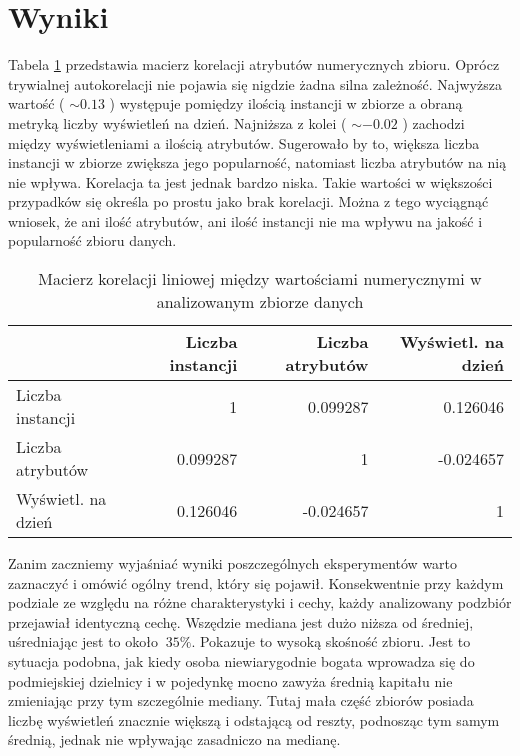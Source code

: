 \section{Wyniki}

Tabela \ref{tab:correlation} przedstawia macierz korelacji atrybutów numerycznych zbioru.
Oprócz trywialnej autokorelacji nie pojawia się nigdzie żadna silna zależność.
Najwyższa wartość ( \( \sim 0.13 \) ) występuje pomiędzy ilością instancji w zbiorze a obraną metryką liczby wyświetleń na dzień.
Najniższa z kolei ( \( \sim -0.02 \) ) zachodzi między wyświetleniami a ilością atrybutów.
Sugerowało by to, większa liczba instancji w zbiorze zwiększa jego popularność, natomiast liczba atrybutów na nią nie wpływa.
Korelacja ta jest jednak bardzo niska.
Takie wartości w większości przypadków się określa po prostu jako brak korelacji.
Można z tego wyciągnąć wniosek, że ani ilość atrybutów, ani ilość instancji nie ma wpływu na jakość i popularność zbioru danych.

\begin{center}
  \begin{table}[ht]
    \begin{tabular}{|l|rrr|}
      \hline
                          & Liczba instancji & Liczba atrybutów & Wyświetl. na dzień \\
      \hline
      Liczba instancji    & 1                & 0.099287         & 0.126046           \\
      Liczba atrybutów    & 0.099287         & 1                & -0.024657          \\
      Wyświetl. na dzień  & 0.126046         & -0.024657        & 1                  \\
      \hline
    \end{tabular}
    \caption{Macierz korelacji liniowej między wartościami numerycznymi w analizowanym zbiorze danych}
    \label{tab:correlation}
  \end{table}
\end{center}

Zanim zaczniemy wyjaśniać wyniki poszczególnych eksperymentów warto zaznaczyć i omówić ogólny trend, który się pojawił.
Konsekwentnie przy każdym podziale ze względu na różne charakterystyki i cechy, każdy analizowany podzbiór przejawiał identyczną cechę.
Wszędzie mediana jest dużo niższa od średniej, uśredniając jest to około \( ~ 35\% \).
Pokazuje to wysoką skośność zbioru.
Jest to sytuacja podobna, jak kiedy osoba niewiarygodnie bogata wprowadza się do podmiejskiej dzielnicy i w pojedynkę mocno zawyża średnią kapitału nie zmieniając przy tym szczególnie mediany.
Tutaj mała część zbiorów posiada liczbę wyświetleń znacznie większą i odstającą od reszty, podnosząc tym samym średnią, jednak nie wpływając zasadniczo na medianę.

